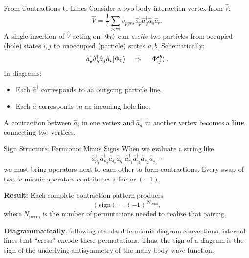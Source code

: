 \documentclass[aspectratio=169]{beamer}
\begin{document}
\begin{frame}{From Contractions to Lines}
Consider a two-body interaction vertex from $\hat{V}$:
\begin{equation}
    \hat{V} = \frac{1}{4} \sum_{pqrs} \bar{v}_{pqrs} \,
    \hat{a}^\dagger_p \hat{a}^\dagger_q \hat{a}_s \hat{a}_r.
\end{equation}
A single insertion of $\hat{V}$ acting on $\ket{\Phi_0}$ can
\emph{excite} two particles from occupied (hole) states $i,j$ to
unoccupied (particle) states $a,b$.
Schematically:
\[
    \hat{a}^\dagger_a \hat{a}^\dagger_b \hat{a}_j \hat{a}_i \ket{\Phi_0}
    \quad \Rightarrow \quad
    \ket{\Phi_{ij}^{ab}}.
\]
In diagrams:
\begin{itemize}
    \item Each $\hat{a}^\dagger$ corresponds to an outgoing particle line.
    \item Each $\hat{a}$ corresponds to an incoming hole line.
\end{itemize}
A contraction between $\hat{a}_i$ in one vertex and $\hat{a}^\dagger_a$
in another vertex becomes a \textbf{line} connecting two vertices.
\end{frame}

\begin{frame}{Sign Structure: Fermionic Minus Signs}
When we evaluate a string like
\[
\hat{a}^\dagger_{p_1} \hat{a}^\dagger_{p_2} \hat{a}_{q_2} \hat{a}_{q_1}
\hat{a}^\dagger_{r_1} \hat{a}^\dagger_{r_2} \hat{a}_{s_2} \hat{a}_{s_1}
\cdots
\]
we must bring operators next to each other to form contractions.
Every swap of two fermionic operators contributes a factor $(-1)$.

\textbf{Result:} Each complete contraction pattern produces
\begin{equation}
(\text{sign}) = (-1)^{N_{\text{perm}}},
\end{equation}
where $N_{\text{perm}}$ is the number of permutations needed to realize
that pairing.

\textbf{Diagrammatically}: following standard fermionic diagram
conventions, internal lines that ``cross'' encode these permutations.
Thus, the sign of a diagram is the sign of the underlying antisymmetry
of the many-body wave function.
\end{frame}
\end{document}
